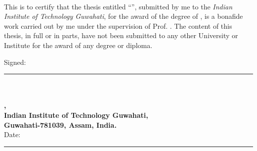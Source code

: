 \documentclass[11pt, a4paper, twoside]{Thesis} %
\begin{document}
\clearpage %

\pagestyle{empty} %

\begin{titlepage}
\begin{center}
\textsc{\textbf{\fontsize{31}{32}\selectfont{Declaration}}}\\[2.0cm] %
\end{center}

 \vspace{0.5cm}

This is to certify that the thesis entitled ``\textbf{\thesisTitle}'',
submitted by me to the \textit{Indian Institute of Technology Guwahati}, for the award of the degree of \degreeName, is a
bonafide work carried out by me under the supervision
of Prof. \supervisorName. The content of this thesis, in full or in parts, have not
been submitted to any other University or Institute for the award
of any degree or diploma.

\vspace{3cm}

Signed:\\ \rule[1em]{25em}{0.5pt}\\[0.1cm] %
\textbf{\authorName}\\
\textbf{\departmentName,}\\
\textbf{Indian Institute of Technology Guwahati,}\\
\textbf{Guwahati-781039, Assam, India.}\\[2cm] \hfill{}Date:\\ \rule[1em]{25em}{0.5pt} %
\end{titlepage}


% 
\end{document}
